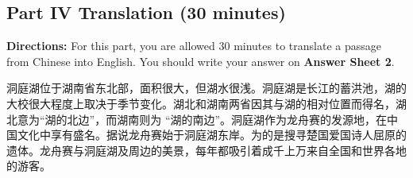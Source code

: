 \documentclass[UTF8,11pt]{ctexart}
\begin{document}
\subsection*{\textbf{Part IV} \textbf{Translation} \textbf{(30 minutes)}}


\textbf{Directions:} For this part, you are allowed 30 minutes to translate a passage from Chinese into English. You should write your answer on\textbf{ Answer Sheet 2}.


洞庭湖位于湖南省东北部，面积很大，但湖水很浅。洞庭湖是长江的蓄洪池，湖的大校很大程度上取决于季节变化。湖北和湖南两省因其与湖的相对位置而得名，湖北意为“湖的北边”，而湖南则为 “湖的南边”。洞庭湖作为龙舟赛的发源地，在中国文化中享有盛名。据说龙舟赛始于洞庭湖东岸。为的是搜寻楚国爱国诗人屈原的遗体。龙舟赛与洞庭湖及周边的美景，每年都吸引着成千上万来自全国和世界各地的游客。
\end{document}
